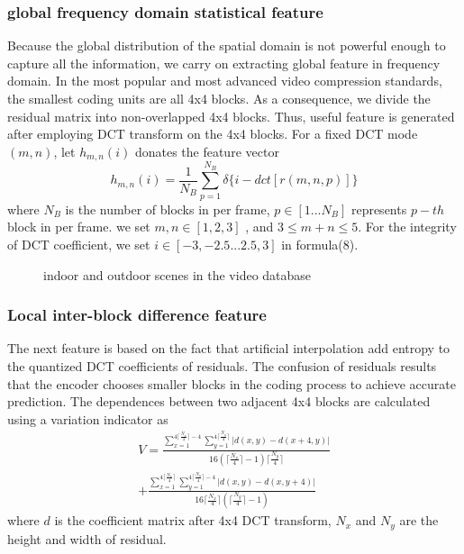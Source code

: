 \documentclass[pdftex,twocolumn,epjc3]{svjour3}          %
\begin{document}
\subsubsection{global frequency domain statistical feature}
Because the global distribution of the spatial domain is not powerful enough to capture all the information, we carry on extracting global feature in frequency domain. In the most popular and most advanced video compression standards, the smallest coding units are all 4x4 blocks. As a consequence, we divide the residual matrix into non-overlapped 4x4 blocks.
Thus, useful feature is generated after employing DCT transform on the 4x4 blocks. For a fixed DCT mode $(m, n)$, let $h_{m,n}(i)$ donates the feature vector
\begin{equation}
h_{m,n}(i)=\frac{1}{N_B}\sum_{p=1}^{N_B} \delta\{i-dct[r(m,n,p)]\}
\end{equation}
where $N_B$ is the number of blocks in per frame, $p\in[1...N_B]$ represents $p-th$ block in per frame. we set $m,n\in[1,2,3]$
, and $3\leq m+n \leq5$. For the integrity of DCT coefficient, we set $i\in[-3,-2.5...2.5,3]$ in formula(8).

\begin{figure*}[tb]
\hfil
{}
\hfil
{}
\hfil
{}
\hfil
\caption{indoor and outdoor scenes in the video database}
\label{fig:5}
\end{figure*}

\subsubsection{Local inter-block difference feature}
The next feature is based on the fact that artificial interpolation add entropy to the quantized DCT coefficients of
residuals. The confusion of residuals results that the encoder chooses smaller blocks in the coding process to achieve
accurate prediction. The dependences between two adjacent 4x4 blocks are calculated using a variation indicator as
\begin{multline}
V=\frac{\sum_{x=1}^{4\lceil \frac{N_x}{4} \rceil-4} \sum_{y=1}^{4\lceil\frac{N_y}{4}\rceil}|d(x,y)-d(x+4,y)|}{16(\lceil \frac{N_x}{4} \rceil-1)\lceil \frac{N_y}{4} \rceil} \\
+\frac{\sum_{x=1}^{4\lceil \frac{N_x}{4} \rceil} \sum_{y=1}^{4\lceil\frac{N_y}{4}\rceil-4}|d(x,y)-d(x,y+4)|}{16\lceil \frac{N_x}{4} \rceil(\lceil \frac{N_y}{4} \rceil-1)}
\end{multline}
where $d$ is the coefficient matrix after 4x4 DCT transform, $N_x$ and $N_y$ are the height and width of residual.
\end{document}
